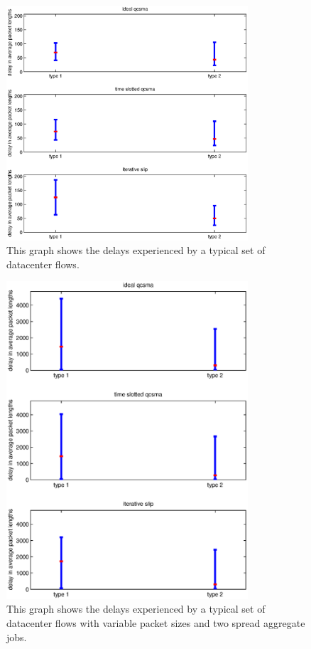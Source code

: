 \documentclass{IEEEtran}%
\begin{document}
\begin{figure}%
	 \includegraphics[width=90mm]{typ_vs.eps}
	\caption{This graph shows the delays experienced by a typical set of datacenter flows.}
	\label{typ_vs}
\end{figure}

\begin{figure}%
	 \includegraphics[width=90mm]{typ_spread_vs.eps}
	\caption{This graph shows the delays experienced by a typical set of datacenter flows with variable packet sizes and two spread aggregate jobs.}
	\label{typ_spread_vs}
\end{figure}


\end{document}
